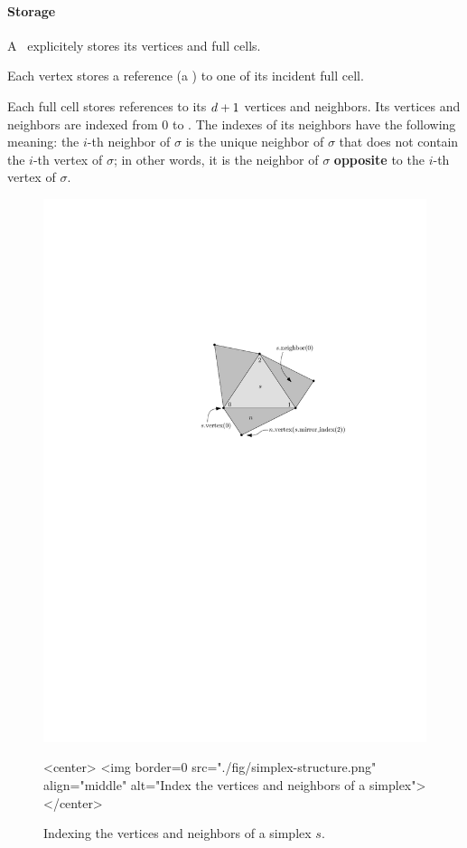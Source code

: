 {{\paragraph{Storage}

A \tds\ explicitely stores its vertices and full cells.

Each vertex stores a reference (a ) to one of its incident
full cell.


Each full cell stores references to its $d+1$ vertices and
neighbors. Its vertices and neighbors are indexed from $0$ to \cd. The indexes
of its neighbors have the following meaning: the $i$-th neighbor of $\sigma$
is the unique neighbor of $\sigma$ that does not contain the $i$-th vertex of
$\sigma$; in other words, it is the neighbor of $\sigma$ \textbf{opposite} to
the $i$-th vertex of $\sigma$.

\begin{figure}[htbp]
\begin{ccTexOnly}
\begin{center}
\includegraphics{Triangulation/fig/simplex-structure.pdf}
\end{center}
\end{ccTexOnly}
\begin{ccHtmlOnly}
<center>
<img border=0 src="./fig/simplex-structure.png" align="middle" alt="Index the vertices and neighbors of a simplex">
</center>
\end{ccHtmlOnly}
\caption{Indexing the vertices and neighbors of a simplex $s$.}
\label{triangulation:fig:simplex}
\end{figure} 

}}
